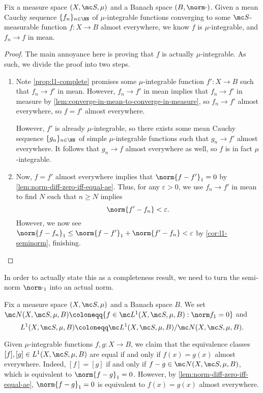 \documentclass[../notes.tex]{subfiles}
\begin{document}
\begin{corollary} \label{cor:limit-of-mu-ints}
	Fix a measure space $(X,\mc S,\mu)$ and a Banach space $(B,\norm\cdot)$. Given a mean Cauchy sequence $\{f_n\}_{n\in\NN}$ of $\mu$-integrable functions converging to some $\mc S$-measurable function $f\colon X\to B$ almost everywhere, we know $f$ is $\mu$-integrable, and $f_n\to f$ in mean.
\end{corollary}
\begin{proof}
	The main annoyance here is proving that $f$ is actually $\mu$-integrable. As such, we divide the proof into two steps.
	\begin{enumerate}
		\item Note \autoref{prop:l1-complete} promises some $\mu$-integrable function $f'\colon X\to B$ such that $f_n\to f'$ in mean. However, $f_n\to f'$ in mean implies that $f_n\to f'$ in measure by \autoref{lem:converge-in-mean-to-converge-in-measure}, so $f_n\to f'$ almost everywhere, so $f=f'$ almost everywhere.

		However, $f'$ is already $\mu$-integrable, so there exists some mean Cauchy sequence $\{g_n\}_{n\in\NN}$ of simple $\mu$-integrable functions such that $g_n\to f'$ almost everywhere. It follows that $g_n\to f$ almost everywhere as well, so $f$ is in fact $\mu$-integrable.

		\item Now, $f=f'$ almost everywhere implies that $\norm{f-f'}_1=0$ by \autoref{lem:norm-diff-zero-iff-equal-ae}. Thus, for any $\varepsilon>0$, we use $f_n\to f'$ in mean to find $N$ such that $n\ge N$ implies
		\[\norm{f'-f_n}<\varepsilon.\]
		However, we now see $\norm{f-f_n}_1\le\norm{f-f'}_1+\norm{f'-f_n}<\varepsilon$ by \autoref{cor:l1-seminorm}, finishing.
		\qedhere
	\end{enumerate}
\end{proof}
In order to actually state this as a completeness result, we need to turn the semi-norm $\norm\cdot_1$ into an actual norm.
\begin{notation}
	Fix a measure space $(X,\mc S,\mu)$ and a Banach space $B$. We set $\mc N(X,\mc S,\mu,B)\coloneqq\{f\in\mc L^1(X,\mc S,\mu,B):\norm f_1=0\}$ and
	\[L^1(X,\mc S,\mu,B)\coloneqq\mc L^1(X,\mc S,\mu,B)/\mc N(X,\mc S,\mu,B).\]
\end{notation}
\begin{remark}
	Given $\mu$-integrable functions $f,g\colon X\to B$, we claim that the equivalence classes $[f],[g]\in L^1(X,\mc S,\mu,B)$ are equal if and only if $f(x)=g(x)$ almost everywhere. Indeed, $[f]=[g]$ if and only if $f-g\in\mc N(X,\mc S,\mu,B)$, which is equivalent to $\norm{f-g}_1=0$. However, by \autoref{lem:norm-diff-zero-iff-equal-ae}, $\norm{f-g}_1=0$ is equivalent to $f(x)=g(x)$ almost everywhere.
\end{remark}
\end{document}
